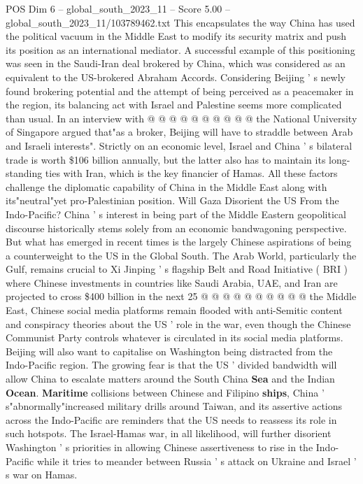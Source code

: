 \begin{textsample}{POS Dim 6 – global\_south\_2023\_11 – Score 5.00 – global\_south\_2023\_11/103789462.txt}
This encapsulates the way China has used the political vacuum in the Middle East to modify its security matrix and push its position as an international mediator.
A successful example of this positioning was seen in the Saudi-Iran deal brokered by China, which was considered as an equivalent to the US-brokered Abraham Accords.
Considering Beijing ' s newly found brokering potential and the attempt of being perceived as a peacemaker in the region, its balancing act with Israel and Palestine seems more complicated than usual.
In an interview with @ @ @ @ @ @ @ @ @ @ the National University of Singapore argued that"as a broker, Beijing will have to straddle between Arab and Israeli interests".
Strictly on an economic level, Israel and China ' s bilateral trade is worth \$106 billion annually, but the latter also has to maintain its long-standing ties with Iran, which is the key financier of Hamas.
All these factors challenge the diplomatic capability of China in the Middle East along with its"neutral"yet pro-Palestinian position.
Will Gaza Disorient the US From the Indo-Pacific?
China ' s interest in being part of the Middle Eastern geopolitical discourse historically stems solely from an economic bandwagoning perspective.
But what has emerged in recent times is the largely Chinese aspirations of being a counterweight to the US in the Global South.
The Arab World, particularly the Gulf, remains crucial to Xi Jinping ' s flagship Belt and Road Initiative ( BRI ) where Chinese investments in countries like Saudi Arabia, UAE, and Iran are projected to cross \$400 billion in the next 25 @ @ @ @ @ @ @ @ @ @ the Middle East, Chinese social media platforms remain flooded with anti-Semitic content and conspiracy theories about the US ' role in the war, even though the Chinese Communist Party controls whatever is circulated in its social media platforms.
Beijing will also want to capitalise on Washington being distracted from the Indo-Pacific region.
The growing fear is that the US ' divided bandwidth will allow China to escalate matters around the South China \textbf{Sea} and the Indian \textbf{Ocean}. \textbf{Maritime} collisions between Chinese and Filipino \textbf{ships}, China ' s"abnormally"increased military drills around Taiwan, and its assertive actions across the Indo-Pacific are reminders that the US needs to reassess its role in such hotspots.
The Israel-Hamas war, in all likelihood, will further disorient Washington ' s priorities in allowing Chinese assertiveness to rise in the Indo-Pacific while it tries to meander between Russia ' s attack on Ukraine and Israel ' s war on Hamas.

\end{textsample}
